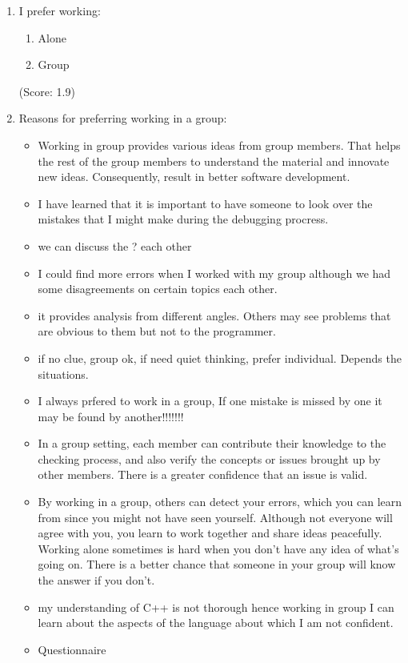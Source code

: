 \begin{enumerate}
\item  I prefer working:
   \begin{enumerate}
     \item[(1)] Alone 
     \item[(2)] Group
   \end{enumerate} 
(Score: 1.9)

\item  Reasons for preferring working in a group:
\begin{itemize}
\item 
Working in group provides various ideas from group members.  That
helps the rest of the group members to understand the material and
innovate new ideas.  Consequently, result in better software development.
\item I have learned that it is important to have someone to look over the
mistakes that I might make during the debugging procress.
\item  
we can discuss the ? each other
\item I could find more errors when I worked with my group although we had
some disagreements on certain topics each other.
\item it provides analysis from different angles. Others may see problems
that are obvious to them but not to the programmer.
\item if no clue, group ok, if need quiet thinking, prefer
individual. Depends the situations.
\item I always prfered to work in a group, If one mistake is missed by one
it may be found by another!!!!!!!

\item In a group setting, each member can contribute their knowledge to the
checking process, and also verify the concepts or issues brought up by
other members.  There is a greater confidence that an issue is valid.
\item By working in a group, others can detect your errors, which you can
learn from since you might not have seen yourself.  Although not everyone will agree with you, you learn to
work together and share ideas peacefully.  Working alone sometimes is
hard when you don't have any idea of what's going on.  There is a
better chance that someone in your group will know the answer if you
don't.

\item my understanding of C++ is not thorough hence working in group I can
learn about the aspects of the language about which I am not confident.
\item Questionnaire


\end{itemize}
\end{enumerate}
